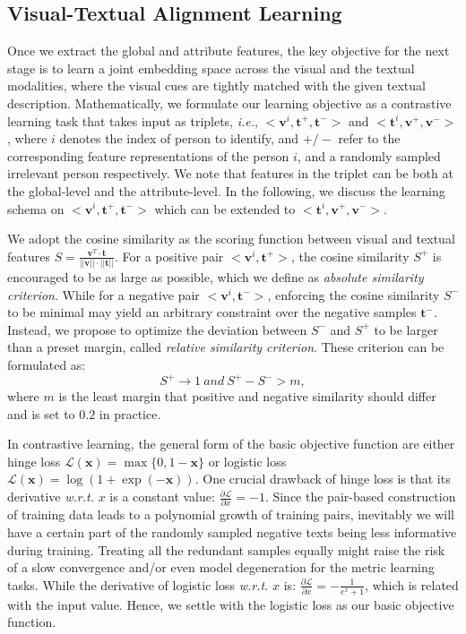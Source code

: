 \documentclass[runningheads]{llncs}
\begin{document}
\subsection{Visual-Textual Alignment Learning}
Once we extract the global and attribute features, the key objective for the next stage is to learn a joint embedding space across the visual and the textual modalities, where the visual cues are tightly matched with the given textual description. 
Mathematically, we formulate our learning objective as a contrastive learning task that takes input as triplets, \textit{i.e.}, $\big<\boldsymbol{v}^i, \boldsymbol{t}^+, \boldsymbol{t}^-\big>$ and $\big<\boldsymbol{t}^i, \boldsymbol{v}^+, \boldsymbol{v}^-\big>$, where $i$ denotes the index of person to identify, and $+/-$ refer to the corresponding feature representations of the person $i$, and a randomly sampled irrelevant person respectively.
We note that features in the triplet can be both at the global-level and the attribute-level. In the following, we discuss the learning schema on $\big<\boldsymbol{v}^i, \boldsymbol{t}^+, \boldsymbol{t}^-\big>$ which can be extended to $\big<\boldsymbol{t}^i, \boldsymbol{v}^+, \boldsymbol{v}^-\big>$.

We adopt the cosine similarity as the scoring function between visual and textual features $S= \frac{\boldsymbol{v}^T\cdot\boldsymbol{t}}{||\boldsymbol{v}||\cdot||\boldsymbol{t}||}$. For a positive pair $\big<\boldsymbol{v}^i, \boldsymbol{t}^+\big>$, the cosine similarity $S^+$ is encouraged to be as large as possible, which we define as \emph{absolute similarity criterion}. While for a negative pair $\big<\boldsymbol{v}^i, \boldsymbol{t}^-\big>$, enforcing the cosine similarity $S^-$ to be minimal may yield an arbitrary constraint over the negative samples $\boldsymbol{t}^-$. Instead, we propose to optimize the deviation between $S^-$ and $S^+$ to be larger than a preset margin, called \emph{relative similarity criterion}. These criterion can be formulated as:
\begin{equation}
S^+\rightarrow 1\ and\ S^+ - S^- > m,
\label{eq:criterion}
\end{equation}
where $m$ is the least margin that positive and negative similarity should differ and is set to $0.2$ in practice.

In contrastive learning, the general form of the basic objective function are either hinge loss $\mathcal{L}(\boldsymbol{x})=\max\{0, 1-\boldsymbol{x}\}$ or logistic loss $\mathcal{L}(\boldsymbol{x})=\log(1+\exp{(-\boldsymbol{x})})$. One crucial drawback of hinge loss is that its derivative \textit{w.r.t.} $x$ is a constant value: $\frac{\partial \mathcal{L}}{\partial x}=-1$. Since the pair-based construction of training data leads to a polynomial growth of training pairs, inevitably we will have a certain part of the randomly sampled negative texts being less informative during training. Treating all the redundant samples equally might raise the risk of a slow convergence and/or even model degeneration for the metric learning tasks. While the derivative of logistic loss \textit{w.r.t.} $x$ is: $\frac{\partial \mathcal{L}}{\partial x}=-\frac{1}{e^x+1}$, which is related with the input value. Hence, we settle with the logistic loss as our basic objective function.
\end{document}
